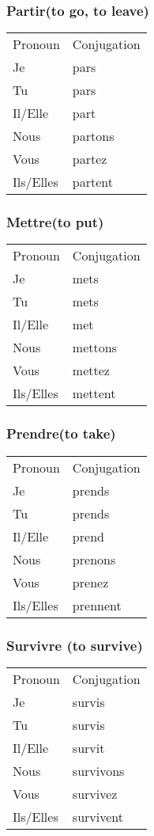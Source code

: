 \subsubsection{Partir(to go, to leave)}
\begin{tabular}{| l | l |}
\hline
Pronoun 	& Conjugation	\\
Je		    &  pars \\
Tu		    &  pars \\
Il/Elle		&  part \\
Nous		&  partons   \\
Vous		&  partez \\
Ils/Elles	&  partent \\
\hline
\end{tabular}

\subsubsection{Mettre(to put)}
\begin{tabular}{| l | l |}
\hline
Pronoun 	& Conjugation	\\
Je		    &  mets \\
Tu		    &  mets \\
Il/Elle		&  met \\
Nous		&  mettons   \\
Vous		&  mettez \\
Ils/Elles	&  mettent \\
\hline
\end{tabular}

\subsubsection{Prendre(to take)}
\begin{tabular}{| l | l |}
\hline
Pronoun 	& Conjugation	\\
Je		    &  prends \\
Tu		    &  prends \\
Il/Elle		&  prend \\
Nous		&  prenons   \\
Vous		&  prenez \\
Ils/Elles	&  prennent \\
\hline
\end{tabular}

\subsubsection{Survivre (to survive)}
\begin{tabular}{| l | l |}
\hline
Pronoun 	& Conjugation	\\
Je		    &  survis \\
Tu		    &  survis \\
Il/Elle		&  survit \\
Nous		&  survivons  \\
Vous		&  survivez \\
Ils/Elles	&  survivent \\
\hline
\end{tabular}

